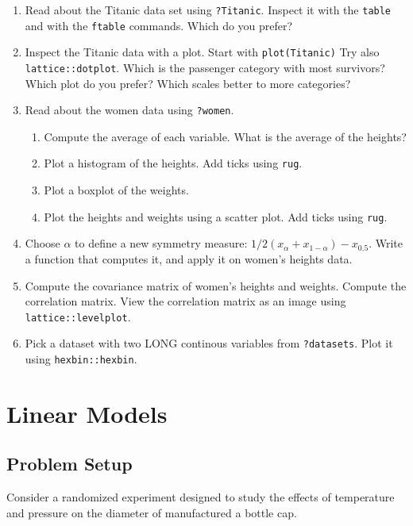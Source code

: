 \documentclass[]{book}
\providecommand{\tightlist}{%
  \setlength{\itemsep}{0pt}\setlength{\parskip}{0pt}}
\theoremstyle{definition}
\theoremstyle{definition}
\theoremstyle{definition}
\theoremstyle{remark}
\let\BeginKnitrBlock\begin \let\EndKnitrBlock\end
\begin{document}
\begin{enumerate}
\def\labelenumi{\arabic{enumi}.}
\item
  Read about the Titanic data set using \texttt{?Titanic}. Inspect it
  with the \texttt{table} and with the \texttt{ftable} commands. Which
  do you prefer?
\item
  Inspect the Titanic data with a plot. Start with
  \texttt{plot(Titanic)} Try also \texttt{lattice::dotplot}. Which is
  the passenger category with most survivors? Which plot do you prefer?
  Which scales better to more categories?
\item
  Read about the women data using \texttt{?women}.

  \begin{enumerate}
  \def\labelenumii{\arabic{enumii}.}
  \tightlist
  \item
    Compute the average of each variable. What is the average of the
    heights?
  \item
    Plot a histogram of the heights. Add ticks using \texttt{rug}.
  \item
    Plot a boxplot of the weights.
  \item
    Plot the heights and weights using a scatter plot. Add ticks using
    \texttt{rug}.
  \end{enumerate}
\item
  Choose \(\alpha\) to define a new symmetry measure:
  \(1/2(x_\alpha+x_{1-\alpha})-x_{0.5}\). Write a function that computes
  it, and apply it on women's heights data.
\item
  Compute the covariance matrix of women's heights and weights. Compute
  the correlation matrix. View the correlation matrix as an image using
  \texttt{lattice::levelplot}.
\item
  Pick a dataset with two LONG continous variables from
  \texttt{?datasets}. Plot it using \texttt{hexbin::hexbin}.
\end{enumerate}

\chapter{Linear Models}\label{lm}

\section{Problem Setup}\label{problem-setup}

\BeginKnitrBlock{example}[Bottle Cap Production]
\protect\hypertarget{exm:cap-experiment}{}{\label{exm:cap-experiment}
{} }Consider a randomized experiment
designed to study the effects of temperature and pressure on the
diameter of manufactured a bottle cap.
\EndKnitrBlock{example}
\end{document}
